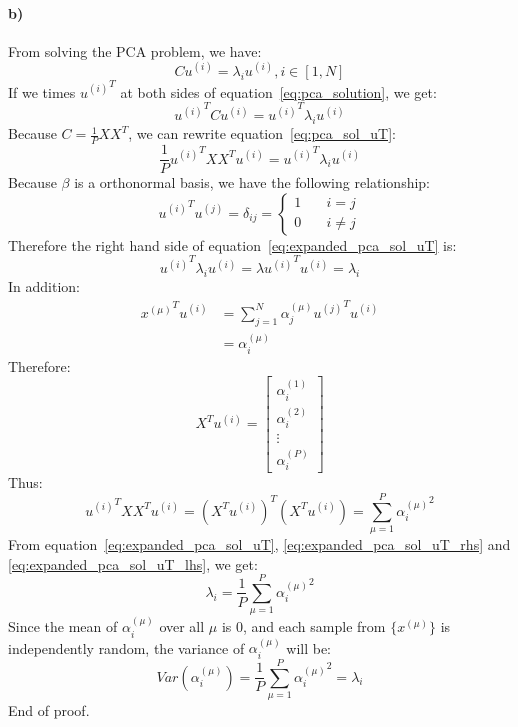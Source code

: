 \documentclass{article}
\begin{document}
\paragraph{b)} From solving the PCA problem, we have:
\begin{equation}
\label{eq:pca_solution}
Cu^{(i)} = \lambda_i u^{(i)}, i \in [1, N]
\end{equation}
If we times ${u^{(i)}}^T$ at both sides of equation~\ref{eq:pca_solution}, we get:
\begin{equation}
\label{eq:pca_sol_uT}
{u^{(i)}}^T C u^{(i)} = {u^{(i)}}^T\lambda_i u^{(i)}
\end{equation}
Because $C = \frac{1}{P}XX^T$, we can rewrite equation~\ref{eq:pca_sol_uT}:
\begin{equation}
\label{eq:expanded_pca_sol_uT}
\frac{1}{P}{u^{(i)}}^T XX^T u^{(i)} = {u^{(i)}}^T\lambda_i u^{(i)}
\end{equation}
Because $\beta$ is a orthonormal basis, we have the following relationship:
\begin{equation}
{u^{(i)}}^T u^{(j)} = \delta_{ij} =
  \begin{cases}
    1       & \quad i=j\\
    0  & \quad i \ne j
  \end{cases}
\end{equation}
Therefore the right hand side of equation~\ref{eq:expanded_pca_sol_uT} is:
\begin{equation}
\label{eq:expanded_pca_sol_uT_rhs}
{u^{(i)}}^T\lambda_i u^{(i)} = \lambda {u^{(i)}}^T u^{(i)} = \lambda_i
\end{equation}
In addition:
\begin{align}
{x^{(\mu)}}^T u^{(i)} &= \sum_{j=1}^{N}{\alpha_j^{(\mu)} {u^{(j)}}^T}u^{(i)} \\
&= \alpha_i^{(\mu)}
\end{align}
Therefore:
\begin{equation}
X^T u^{(i)} = \begin{bmatrix}
\alpha_i^{(1)} \\ \alpha_i^{(2)} \\ \vdots \\ \alpha_i^{(P)}
\end{bmatrix}
\end{equation}
Thus:
\begin{equation}
\label{eq:expanded_pca_sol_uT_lhs}
{u^{(i)}}^T XX^T u^{(i)} = {(X^T u^{(i)})^T}(X^T u^{(i)}) = \sum_{\mu=1}^{P}{\alpha_i^{(\mu)}}^2
\end{equation}
From equation~\ref{eq:expanded_pca_sol_uT}, \ref{eq:expanded_pca_sol_uT_rhs} and \ref{eq:expanded_pca_sol_uT_lhs}, we get:
\begin{equation}
\label{eq:lamba_eq_var}
\lambda_i = \frac{1}{P}\sum_{\mu=1}^{P}{\alpha_i^{(\mu)}}^2
\end{equation}
Since the mean of $\alpha_i^{(\mu)}$ over all $\mu$ is 0, and each sample from $\{x^{(\mu)}\}$ is independently random, the variance of $\alpha_i^{(\mu)}$ will be:
$$
Var(\alpha_i^{(\mu)}) = \frac{1}{P}\sum_{\mu=1}^{P}{\alpha_i^{(\mu)}}^2 = \lambda_i
$$
End of proof. 
\end{document}
